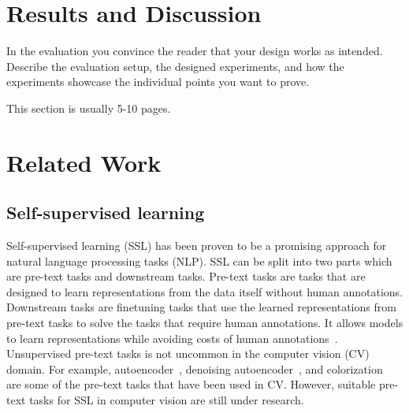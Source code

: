 \documentclass[a4paper,11pt,oneside]{report}
\begin{document}
\chapter{Results and Discussion}

In the evaluation you convince the reader that your design works as intended.
Describe the evaluation setup, the designed experiments, and how the
experiments showcase the individual points you want to prove.

This section is usually 5-10 pages.


\chapter{Related Work}



\section{Self-supervised learning}
Self-supervised learning (SSL) has been proven to be a promising approach for natural language processing tasks (NLP). SSL can be split into two parts which are pre-text tasks and downstream tasks. Pre-text tasks are tasks that are designed to learn representations from the data itself without human annotations. Downstream tasks are finetuning tasks that use the learned representations from pre-text tasks to solve the tasks that require human annotations. It allows models to learn representations while avoiding costs of human annotations~\cite{Jaiswal2020}. Unsupervised pre-text tasks is not uncommon in the computer vision (CV) domain. For example, autoencoder~\cite{Hinton2006}, denoising autoencoder~\cite{Vincent2008}, and colorization~\cite{Larsson2017} are some of the pre-text tasks that have been used in CV. However, suitable pre-text tasks for SSL in computer vision are still under research.
\end{document}
